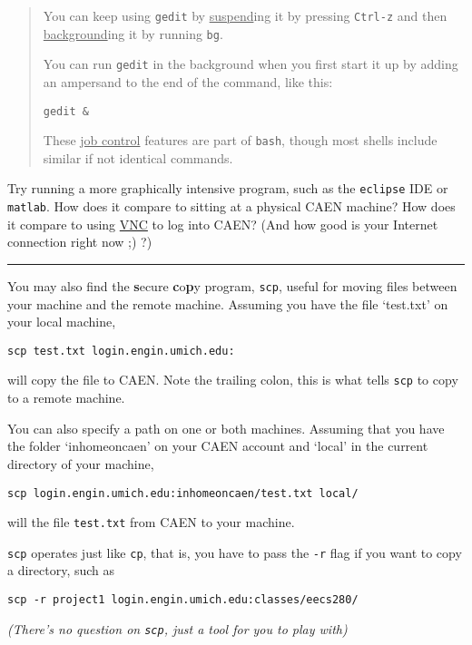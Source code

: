 \documentclass{article}
\begin{document}
\begin{quote}
  \color{violet}
  You can keep using \texttt{gedit} by \ul{suspend}ing it by pressing
  \texttt{Ctrl-z} and then \ul{background}ing it by running \texttt{bg}.

  You can run \texttt{gedit} in the background when you first start it up by
  adding an ampersand to the end of the command, like this:

  \texttt{gedit \&}

  These \ul{job control} features are part of \texttt{bash}, though most
  shells include similar if not identical commands.
\end{quote}

\vfill
Try running a more graphically intensive program, such as the \texttt{eclipse}
IDE or \texttt{matlab}. How does it compare to sitting at a physical CAEN
machine? How does it compare to using
\href{http://caenfaq.engin.umich.edu/12374-Linux-Login-Service/how-do-i-connect-to-a-caen-linux-computer-remotely}{VNC}
to log into CAEN? (And how good is your Internet connection right now ;) ?)

\bigskip
\hrule
You may also find the \textbf{s}ecure \textbf{c}o\textbf{p}y program,
\texttt{scp}, useful for moving files between your machine and the remote
machine. Assuming you have the file `test.txt' on your local machine,

\texttt{scp~test.txt~login.engin.umich.edu:}

will copy the file to CAEN. Note the trailing colon, this is what tells
\texttt{scp} to copy to a remote machine.

You can also specify a path on one or both machines. Assuming that you have
the folder `inhomeoncaen' on your CAEN account and `local' in the current
directory of your machine,

\texttt{scp~login.engin.umich.edu:inhomeoncaen/test.txt~local/}

will the file \texttt{test.txt} from CAEN to your machine.

\texttt{scp} operates just like \texttt{cp}, that is, you have to pass the
\texttt{-r} flag if you want to copy a directory, such as

\texttt{scp~-r~project1~login.engin.umich.edu:classes/eecs280/}

\emph{(There's no question on \texttt{scp}, just a tool for you to play with)}
\end{document}
